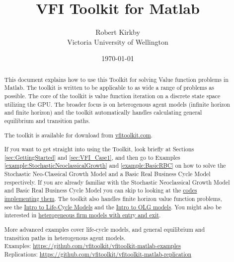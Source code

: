\documentclass[11pt,fleqn]{article}
\begin{document}
\title{VFI Toolkit for Matlab}
\author{Robert Kirkby \\ Victoria University of Wellington}
\date{\today}
\maketitle


\begin{abstract}
\noindent This document explains how to use this Toolkit for solving Value function problems in Matlab. The toolkit is written to be applicable to as wide a range of problems as possible. The core of the toolkit is value function iteration on a discrete state space utilizing the GPU. The broader focus is on heterogenous agent models (infinite horizon and finite horizon) and the toolkit automatically handles calculating general equilibrium and transition paths.

The toolkit is available for download from \href{http://www.vfitoolkit.com}{vfitoolkit.com}.

If you want to get straight into using the Toolkit, look briefly at Sections \ref{sec:GettingStarted} and \ref{sec:VFI_Case1}, and then go to Examples \ref{example:StochasticNeoclassicalGrowth} and \ref{example:BasicRBC} on how to solve the Stochastic Neo-Classical Growth Model and a Basic Real Business Cycle Model respectively. If you are already familiar with the Stochastic Neoclassical Growth Model and  Basic Real Business Cycle Model you can skip to looking at the \href{https://github.com/vfitoolkit/VFItoolkit-matlab-examples}{codes implementing them}. The toolkit also handles finite horizon value function problems, see the \href{https://www.vfitoolkit.com/updates-blog/2021/an-introduction-to-life-cycle-models/}{Intro to Life-Cycle Models} and the \href{https://www.vfitoolkit.com/updates-blog/2022/an-introduction-to-olg-models/}{Intro to OLG models}. You might also be interested in \href{https://www.vfitoolkit.com/updates-blog/2020/entry-exit-example-based-on-hopenhayn-rogerson-1993/}{heterogeneous firm models with entry and exit}.

More advanced examples cover life-cycle models, and general equilibrium and transition paths in heterogenous agent models. \\
Examples: \href{https://github.com/vfitoolkit/VFItoolkit-matlab-examples}{https://github.com/vfitoolkit/vfitoolkit-matlab-examples} \\
Replications: \href{https://github.com/vfitoolkit/vfitoolkit-matlab-replication}{https://github.com/vfitoolkit/vfitoolkit-matlab-replication}

\end{abstract}
\end{document}
